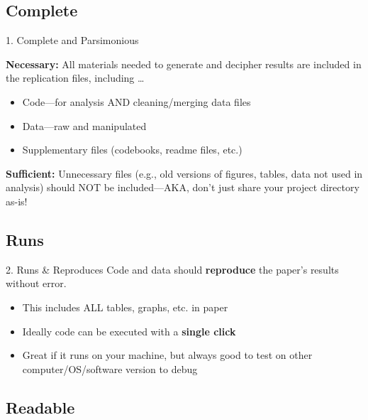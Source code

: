 \documentclass[12pt, compress]{beamer} %
\let\olditem\item %
\renewcommand{\item}{%
\olditem\vspace{\fill}}
\begin{document}
\subsection{Complete}
	\begin{frame}{1. Complete and Parsimonious}
	
	\textbf{Necessary:} All materials needed to generate and decipher results are included in the replication files, including \dots

		\pause
		\begin{itemize}		
			\item Code---for analysis AND cleaning/merging data files
			\item Data---raw and manipulated
			\item Supplementary files (codebooks, readme files, etc.)
		\end{itemize} 
		
		\bigskip
		
		\pause
	\textbf{Sufficient:} Unnecessary files (e.g., old versions of figures, tables, data not used in analysis) should NOT be included---\textcolor{burntorange}{AKA, don't just share your project directory as-is!}
			
	\end{frame}


\subsection{Runs}
	\begin{frame}{2. Runs \& Reproduces}
		Code and data should \textbf{reproduce} the paper's results without error. 
		
		\pause
		\begin{itemize}
			\item This includes ALL tables, graphs, etc. in paper
			\item Ideally code can be executed with a \textbf{single click}
			\item Great if it runs on your machine, but always good to test on other computer/OS/software version to debug
		\end{itemize}
		
			
	\end{frame}

\subsection{Readable}
\end{document}
